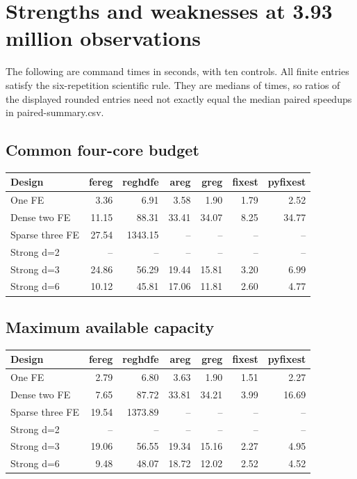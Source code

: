 \documentclass[11pt]{article}
\begin{document}
\clearpage\section{Strengths and weaknesses at 3.93 million observations}

The following are command times in seconds, with ten controls. All finite entries satisfy the six-repetition scientific rule. They are medians of times, so ratios of the displayed rounded entries need not exactly equal the median paired speedups in paired-summary.csv.

\subsection*{Common four-core budget}

\small\begin{longtable}{lrrrrrr}
\toprule
Design & fereg & reghdfe & areg & greg & fixest & pyfixest\\\midrule\endhead
One FE & 3.36 & 6.91 & 3.58 & 1.90 & 1.79 & 2.52\\
Dense two FE & 11.15 & 88.31 & 33.41 & 34.07 & 8.25 & 34.77\\
Sparse three FE & 27.54 & 1343.15 & -- & -- & -- & --\\
Strong d=2 & -- & -- & -- & -- & -- & --\\
Strong d=3 & 24.86 & 56.29 & 19.44 & 15.81 & 3.20 & 6.99\\
Strong d=6 & 10.12 & 45.81 & 17.06 & 11.81 & 2.60 & 4.77\\
\bottomrule\end{longtable}\normalsize

\subsection*{Maximum available capacity}

\small\begin{longtable}{lrrrrrr}
\toprule
Design & fereg & reghdfe & areg & greg & fixest & pyfixest\\\midrule\endhead
One FE & 2.79 & 6.80 & 3.63 & 1.90 & 1.51 & 2.27\\
Dense two FE & 7.65 & 87.72 & 33.81 & 34.21 & 3.99 & 16.69\\
Sparse three FE & 19.54 & 1373.89 & -- & -- & -- & --\\
Strong d=2 & -- & -- & -- & -- & -- & --\\
Strong d=3 & 19.06 & 56.55 & 19.34 & 15.16 & 2.27 & 4.95\\
Strong d=6 & 9.48 & 48.07 & 18.72 & 12.02 & 2.52 & 4.52\\
\bottomrule\end{longtable}\normalsize
\end{document}
